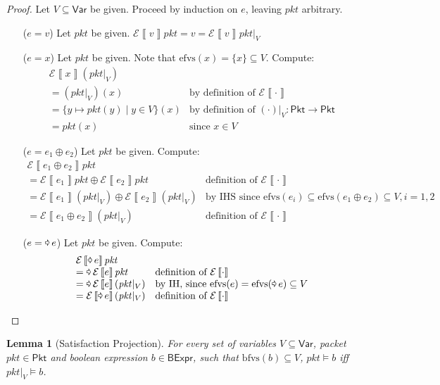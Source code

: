 \documentclass{article}
\newcommand{\pkt}{\mathit{pkt}}
\newcommand{\denote}[1]{\left\llbracket#1\right\rrbracket}
\newcommand{\edenote}[1]{\mathcal{E}\denote{#1}}
\newcommand{\binop}{\mathbin{\oplus}}
\newcommand{\unop}{\mathop{\text{\pointer}}}
\newcommand{\BExpr}{\mathsf{BExpr}}
\newcommand{\Pkt}{\mathsf{Pkt}}
\newcommand{\Var}{\mathsf{Var}}
\newcommand{\efvs}{\textrm{efvs}}
\newcommand{\bfvs}{\textrm{bfvs}}
\newtheorem{lemma}{Lemma}
\begin{document}
\begin{proof}
  Let $V \subseteq \Var$ be given.
  Proceed by induction on $e$, leaving $\pkt$ arbitrary.
  \begin{enumerate}[align=left]
  \item[($e = v$)] Let $\pkt$ be given. $\edenote{v}\pkt = v = \edenote{v}{\pkt|_V}$
  \item[($e = x$)] Let $\pkt$ be given. Note that $\efvs(x) = \{x\} \subseteq V$. Compute:
    \[\begin{array}{ll}
    \edenote{x}(\pkt|_V) \\
    = (\pkt|_V)(x)
    & \text{by definition of }\edenote\cdot\\
    = \{y \mapsto \pkt(y) \mid y \in V\}(x)
    & \text{by definition of }(\cdot)|_V : \Pkt \to \Pkt\\
    = \pkt(x) & \text{since } x \in V
    \end{array}
    \]
  \item[($e = e_1 \binop e_2$)] Let $\pkt$ be given. Compute:
    \[\begin{array}{ll}
    \edenote{e_1 \binop e_2}\pkt \\
    = \edenote{e_1}\pkt \binop \edenote{e_2}\pkt & \text{definition of }\edenote\cdot \\
    = \edenote{e_1}(\pkt|_V) \binop \edenote{e_2}(\pkt|_V) & \text{by IHS since }\efvs(e_i) \subseteq \efvs(e_1 \binop e_2) \subseteq V, i = 1,2 \\
    = \edenote{e_1 \binop e_2}(\pkt|_V) & \text{definition of }\edenote\cdot
    \end{array}\]
  \item[($e = \unop e$)] Let $\pkt$ be given. Compute:
    \[\begin{array}{ll}
    \edenote{\unop e}\pkt \\
    = \unop \edenote{e}\pkt & \text{definition of }\edenote\cdot \\
    = \unop \edenote{e}(\pkt|_V) & \text{by IH, since } \efvs(e) = \efvs(\unop e) \subseteq V \\
    = \edenote{\unop e}(\pkt|_V) & \text{definition of }\edenote\cdot
    \end{array}\]
  \end{enumerate}
\end{proof}

\begin{lemma}[Satisfaction Projection]
  \label{lem:proj-satis}
  For every set of variables $V \subseteq \Var$, packet $\pkt \in \Pkt$ and
  boolean expression $b \in \BExpr$, such that $\bfvs(b) \subseteq V$,
  $\pkt \models b$ iff $\pkt|_V \models b$.
\end{lemma}
\end{document}
